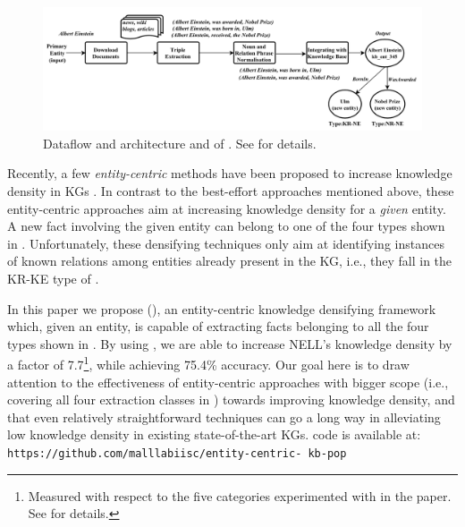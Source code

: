 \begin{figure}[!htbp]
\includegraphics[scale= 0.36]{images/pipeline.png}
\caption{Dataflow and architecture and  of \system{}. See  for details.}
\label{fig:pipeline}
\end{figure}

Recently, a few \emph{entity-centric} methods have been proposed to increase knowledge density in KGs \cite{gardner2013improving,gardner2014incorporating}. In contrast to the best-effort approaches mentioned above, these entity-centric approaches aim at increasing knowledge density for a \emph{given} entity. A new fact involving the  given entity can belong to one of the four types  shown in . Unfortunately, these densifying techniques only aim at identifying instances of known relations among entities already present in the KG, i.e., they fall in the KR-KE type of .

In this paper we propose \systemfull{} (\system{}), an entity-centric knowledge densifying framework which, given an entity, is capable of extracting facts belonging to all the four types shown in . By using \system{}, we are able to increase NELL's knowledge density by a factor of 7.7\footnote{Measured with respect to the five categories experimented with in the paper. See  for details.}, while achieving 75.4\% accuracy. %
Our goal here is to draw attention to the effectiveness of entity-centric approaches with bigger scope (i.e., covering all four extraction classes  in ) towards improving knowledge density, and that even relatively straightforward techniques can go a long way in alleviating low knowledge density in existing state-of-the-art KGs. \system{} code is available at: {\small {\tt https://github.com/malllabiisc/entity-centric- kb-pop}} %


